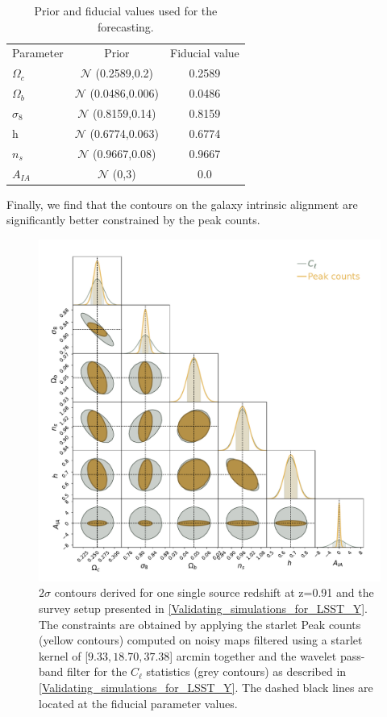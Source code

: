 \documentclass{aa}
\begin{document}
\begin{table}
	\centering
	\caption{ Prior and fiducial values used for the forecasting.}
	\begin{tabular}{lcc} 
		\hline \hline
		Parameter  & Prior & Fiducial value \\
		$\Omega_c$ & $\mathcal{N}$ (0.2589,0.2) & 0.2589 \\
		$\Omega_b$ & $\mathcal{N}$ (0.0486,0.006) & 0.0486 \\
		$\sigma_8$ & $\mathcal{N}$ (0.8159,0.14) & 0.8159 \\
		h & $\mathcal{N}$ (0.6774,0.063) & 0.6774\\
		$n_s$ & $\mathcal{N}$ (0.9667,0.08) & 0.9667 \\
		$A_{IA}$ &  $\mathcal{N}$ (0,3) &  0.0 \\
		\hline
	\end{tabular}
	\label{tab:prior}
\end{table}
Finally, we find that the contours on the galaxy intrinsic alignment are significantly better constrained by the peak counts. 



 
\begin{figure}
    \centering
    \includegraphics[width=\textwidth]{paper/figures/Fisher_n.pdf}
    \caption{$2\sigma$ contours derived for one single source redshift at z=0.91 and the survey setup presented in \autoref{Validating_simulations_for_LSST_Y}. The constraints are obtained by applying the starlet Peak counts (yellow contours) computed on noisy maps filtered using a starlet kernel of [$9.33, 18.70, 37.38$] arcmin together and the wavelet pass-band filter for the $C_{\ell}$ statistics (grey contours) as described in \autoref{Validating_simulations_for_LSST_Y}.  
The dashed black lines are located at the fiducial parameter values.}
     \label{fig:Fisher_result}
\end{figure}
\end{document}
